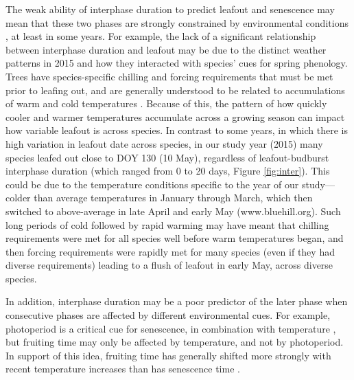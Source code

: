 \documentclass{article}
\begin{document}
\par The weak ability of interphase duration to predict leafout and senescence may mean that these two phases are strongly constrained by environmental conditions \citep{fenner1998}, at least in some years. For example, the lack of a significant relationship between interphase duration and leafout may be due to the distinct weather patterns in 2015 and how they interacted with species' cues for spring phenology.  Trees have species-specific chilling and forcing requirements that must be met prior to leafing out, and are generally understood to be related to accumulations of warm and cold temperatures \citep[e.g.][]{schwartz2010,chuine2010,clark2014b,flynnrev}. Because of this, the pattern of how quickly cooler and warmer temperatures accumulate across a growing season can impact how variable leafout is across species. In contrast to some years, in which there is high variation in leafout date across species, in our study year (2015) many species leafed out close to DOY 130 (10 May), regardless of leafout-budburst interphase duration (which ranged from 0 to 20 days, Figure \ref{fig:inter}).  This could be due to the temperature conditions specific to the year of our study---colder than average temperatures in January through March, which then switched to above-average in late April and early May (www.bluehill.org). Such long periods of cold followed by rapid warming may have meant that chilling requirements were met for all species well before warm temperatures began, and then forcing requirements were rapidly met for many species (even if they had diverse requirements) leading to a flush of leafout in early May, across diverse species. 

\par In addition, interphase duration may be a poor predictor of the later phase when consecutive phases are affected by different environmental cues. For example, photoperiod is a critical cue for senescence, in combination with temperature \citep{delpierre2009}, but fruiting time may only be affected by temperature, and not by photoperiod. In support of this idea, fruiting time has generally shifted more strongly with recent temperature increases than has senescence time \citep{menzel2006}.
\end{document}
